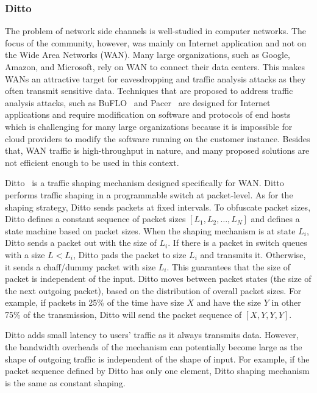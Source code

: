 \subsubsection{Ditto}
The problem of network side channels is well-studied in computer networks.
The focus of the community, however, was mainly on Internet application and not on the Wide Area Networks (WAN).
Many large organizations, such as Google, Amazon, and Microsoft, rely on WAN to connect their data centers.
This makes WANs an attractive target for eavesdropping and traffic analysis attacks as they often transmit sensitive data.
Techniques that are proposed to address traffic analysis attacks, such as BuFLO~\cite{cai2014cs} and Pacer~\cite{mehta2022pacer} are designed for Internet applications and require modification on software and protocols of end hosts which is challenging for many large organizations because it is impossible for cloud providers to modify the software running on the customer instance.
Besides that, WAN traffic is high-throughput in nature, and many proposed solutions are not efficient enough to be used in this context.

Ditto~\cite{meier2022ditto} is a traffic shaping mechanism designed specifically for WAN.
Ditto performs traffic shaping in a programmable switch at packet-level.
As for the shaping strategy, Ditto sends packets at fixed intervals.
To obfuscate packet sizes, Ditto defines a constant sequence of packet sizes $[L_1, L_2, \dots, L_N]$ and defines a state machine based on packet sizes.
When the shaping mechanism is at state $L_i$, Ditto sends a packet out with the size of $L_i$.
If there is a packet in switch queues with a size $L < L_i$, Ditto pads the packet to size $L_i$ and transmits it.
Otherwise, it sends a chaff/dummy packet with size $L_i$.
This guarantees that the size of packet is independent of the input.
Ditto moves between packet states (the size of the next outgoing packet), based on the distribution of overall packet sizes.
For example, if packets in 25\% of the time have size $X$ and have the size $Y$ in other 75\% of the transmission, Ditto will send the packet sequence of $[X, Y, Y, Y]$.

Ditto adds small latency to users' traffic as it always transmits data.
However, the bandwidth overheads of the mechanism can potentially become large as the shape of outgoing traffic is independent of the shape of input.
For example, if the packet sequence defined by Ditto has only one element, Ditto shaping mechanism is the same as constant shaping.  

